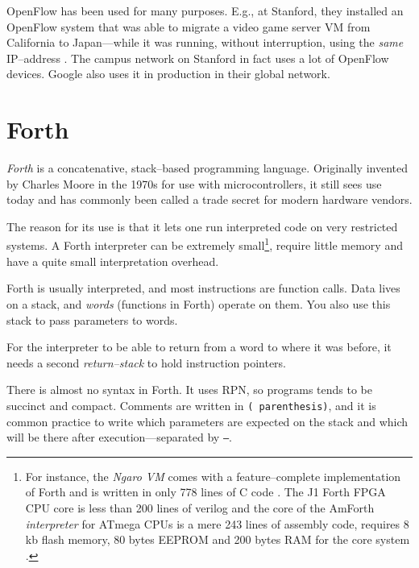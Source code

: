 OpenFlow has been used for many purposes.  E.g., at Stanford, they installed
an OpenFlow system that was able to migrate a video game server \ac{VM} from
California to Japan---while it was running, without interruption, using the
\textit{same} IP--address \cite{erickson2008demonstration}
\cite{kobayashi2013maturing}.
The campus network on Stanford in fact uses a lot of OpenFlow devices.
Google also uses it in production in their global network.

\section{Forth}

\textit{Forth} is a concatenative, stack--based programming language.
Originally invented by Charles Moore in the 1970s for use with
microcontrollers, it still sees use today and has commonly been called a
trade secret for modern hardware vendors.


The reason for its use is that it lets one run interpreted code on very
restricted systems. A Forth interpreter can be extremely small\footnote{For
instance, the \textit{Ngaro \ac{VM}} comes with a feature--complete
implementation of Forth and is written in only 778 lines of C code
\cite{ngaro.vm.core}.  The J1 Forth FPGA CPU core is less than 200 lines of verilog
\cite{bowman2010j1} and the core of the AmForth \textit{interpreter} for
ATmega CPUs is a mere 243 lines of assembly code, requires 8 kb flash
memory, 80 bytes EEPROM and 200 bytes RAM for the core system
\cite{amforth}.}, require little memory and have a quite small
interpretation overhead.

Forth is usually interpreted, and most instructions are function calls.
Data lives on a stack, and \textit{words} (functions in Forth) operate on them.
You also use this stack to pass parameters to words.

For the interpreter to be able to return from a word to where it was before,
it needs a second \textit{return--stack} to hold instruction pointers.

There is almost no syntax in Forth.  It uses \ac{RPN}, so programs tends to
be succinct and compact.  Comments are written in \texttt{( parenthesis)},
and it is common practice to write which parameters are expected on the
stack and which will be there after execution---separated by \texttt{--}.

